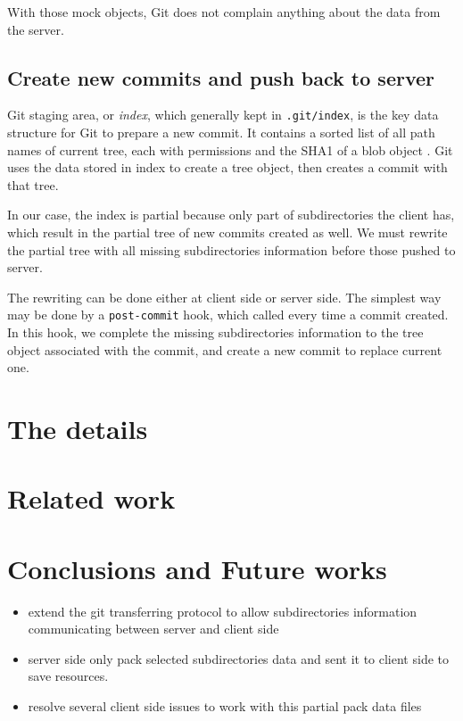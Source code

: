 \documentclass[preprint]{sigplanconf}
\begin{document}
With those mock objects, Git does not complain anything about the data from the server.

\subsection{Create new commits and push back to server}
Git staging area, or \emph{index}, which generally kept in \verb|.git/index|, is the key data structure for Git to prepare a new commit.
It contains a sorted list of all path names of current tree, each with permissions and the SHA1 of a blob object \cite{idx-format}.
Git uses the data stored in index to create a tree object, then creates a commit with that tree.

In our case, the index is partial because only part of subdirectories the client has, which result in the partial tree of new commits created as well.
We must rewrite the partial tree with all missing subdirectories information before those pushed to server.

The rewriting can be done either at client side or server side.
The simplest way may be done by a \verb|post-commit| hook, which called every time a commit created.
In this hook, we complete the missing subdirectories information to the tree object associated with the commit, and create a new commit to replace current one.




\section{The details}


\section{Related work}

\section{Conclusions and Future works}


\begin{itemize}
  \item  extend the git transferring protocol to allow subdirectories information communicating between server and client side
  \item server side only pack selected subdirectories data and sent it to client side to save resources.
  \item resolve several client side issues to work with this partial pack data files
\end{itemize}
\end{document}
